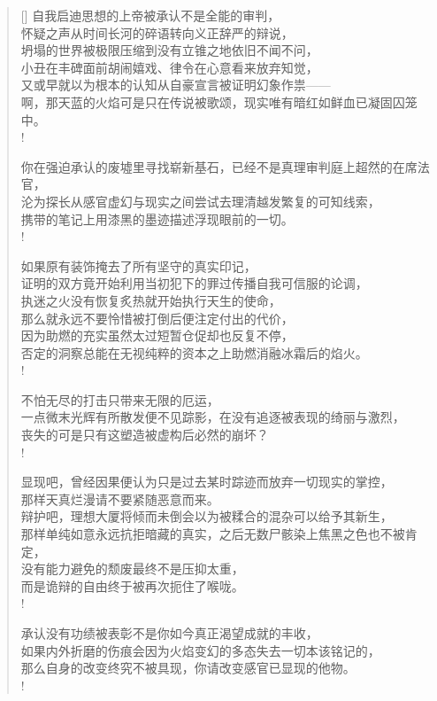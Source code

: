 \documentclass[UTF8, 12pt, a4paper]{ctexrep} %
\begin{document}
\begin{verse}[\versewidth]
自我启迪思想的上帝被承认不是全能的审判，\\
怀疑之声从时间长河的碎语转向义正辞严的辩说，\\
坍塌的世界被极限压缩到没有立锥之地依旧不闻不问，\\
小丑在丰碑面前胡闹嬉戏、律令在心意看来放弃知觉，\\
又或早就以为根本的认知从自豪宣言被证明幻象作祟——\\
啊，那天蓝的火焰可是只在传说被歌颂，现实唯有暗红如鲜血已凝固囚笼中。\\!

你在强迫承认的废墟里寻找崭新基石，已经不是真理审判庭上超然的在席法官，\\
沦为探长从感官虚幻与现实之间尝试去理清越发繁复的可知线索，\\
携带的笔记上用漆黑的墨迹描述浮现眼前的一切。\\!

如果原有装饰掩去了所有坚守的真实印记，\\
证明的双方竟开始利用当初犯下的罪过传播自我可信服的论调，\\
执迷之火没有恢复炙热就开始执行天生的使命，\\
那么就永远不要怜惜被打倒后便注定付出的代价，\\
因为助燃的充实虽然太过短暂仓促却也反复不停，\\
否定的洞察总能在无视纯粹的资本之上助燃消融冰霜后的焰火。\\!

不怕无尽的打击只带来无限的厄运，\\
一点微末光辉有所散发便不见踪影，在没有追逐被表现的绮丽与激烈，\\
丧失的可是只有这塑造被虚构后必然的崩坏？\\!

显现吧，曾经因果便认为只是过去某时踪迹而放弃一切现实的掌控，\\
那样天真烂漫请不要紧随恶意而来。\\
辩护吧，理想大厦将倾而未倒会以为被糅合的混杂可以给予其新生，\\
那样单纯如意永远抗拒暗藏的真实，之后无数尸骸染上焦黑之色也不被肯定，\\
没有能力避免的颓废最终不是压抑太重，\\
而是诡辩的自由终于被再次扼住了喉咙。\\!

承认没有功绩被表彰不是你如今真正渴望成就的丰收，\\
如果内外折磨的伤痕会因为火焰变幻的多态失去一切本该铭记的，\\
那么自身的改变终究不被具现，你请改变感官已显现的他物。\\!


\end{verse}
\end{document}
